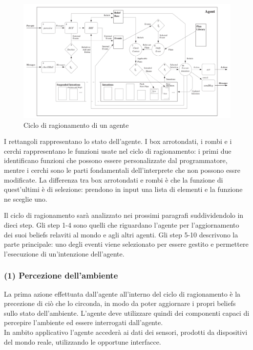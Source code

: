 \documentclass[12pt,a4paper,openright,twoside]{report}
\begin{document}
\begin{figure}[h] %
\begin{center} %
\includegraphics[width=16cm]{images/reasoningCicle.png} %
\caption[Ciclo di ragionamento di un agente]{Ciclo di ragionamento di un agente} \label{fig:reasoningCicle}
\end{center}
\end{figure}

I rettangoli rappresentano lo stato dell'agente. I box arrotondati, i rombi e i cerchi rappresentano le funzioni usate nel ciclo di ragionamento: i primi due identificano funzioni che possono essere personalizzate dal programmatore, mentre i cerchi sono le parti fondamentali dell'interprete che non possono essre modificate. La differenza tra box arrotondati e rombi \`e che la funzione di quest'ultimi \`e di selezione: prendono in input una lista di elementi e la funzione ne sceglie uno.

Il ciclo di ragionamento sar\`a analizzato nei prossimi paragrafi suddividendolo in dieci step. Gli step 1-4 sono quelli che riguardano l'agente per l'aggiornamento dei suoi beliefs relaviti al mondo e agli altri agenti. Gli step 5-10 descrivono la parte principale: uno degli eventi viene selezionato per essere gestito e permettere l'esecuzione di un'intenzione dell'agente.


\subsubsection{(1) Percezione dell'ambiente}
La prima azione effettuata dall'agente all'interno del ciclo di ragionamento \`e la precezione di ci\`o che lo circonda, in modo da poter aggiornare i propri beliefs sullo stato dell'ambiente. L'agente deve utilizzare quindi dei componenti capaci di percepire l'ambiente ed essere interrogati dall'agente.
\\
In ambito applicativo l'agente acceder\`a ai dati dei sensori, prodotti da dispositivi del mondo reale, utilizzando le opportune interfacce.
\end{document}
